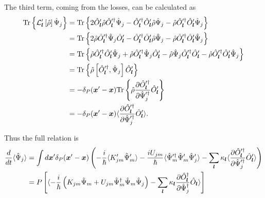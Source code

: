 The third term, coming from the losses, can be calculated as
\begin{equation*}
\begin{split}
	\mathrm{Tr} \left\{ 
		\mathcal{L}_{\boldsymbol{l}}^\prime \left[ \hat{\rho} \right]
		\hat{\Psi}_j
	 \right\}
	& = \mathrm{Tr} \left\{ 
		2 \hat{O}_{\boldsymbol{l}}^\prime \hat{\rho} \hat{O}_{\boldsymbol{l}}^{\prime\dagger} \hat{\Psi}_j
		- \hat{O}_{\boldsymbol{l}}^{\prime\dagger} \hat{O}_{\boldsymbol{l}}^\prime \hat{\rho} \hat{\Psi}_j
		- \hat{\rho} \hat{O}_{\boldsymbol{l}}^{\prime\dagger} \hat{O}_{\boldsymbol{l}}^\prime \hat{\Psi}_j
	 \right\} \\
	& = \mathrm{Tr} \left\{ 
		2 \hat{\rho} \hat{O}_{\boldsymbol{l}}^{\prime\dagger} \hat{\Psi}_j \hat{O}_{\boldsymbol{l}}^\prime
		- \hat{O}_{\boldsymbol{l}}^{\prime\dagger} \hat{O}_{\boldsymbol{l}}^\prime \hat{\rho} \hat{\Psi}_j
		- \hat{\rho} \hat{O}_{\boldsymbol{l}}^{\prime\dagger} \hat{O}_{\boldsymbol{l}}^\prime \hat{\Psi}_j
	 \right\} \\
	& = \mathrm{Tr} \left\{ 
		\hat{\rho} \hat{O}_{\boldsymbol{l}}^{\prime\dagger} \hat{O}_{\boldsymbol{l}}^\prime \hat{\Psi}_j
		+ \hat{\rho} \hat{O}_{\boldsymbol{l}}^{\prime\dagger} \hat{\Psi}_j \hat{O}_{\boldsymbol{l}}^\prime
		- \hat{\rho} \hat{\Psi}_j \hat{O}_{\boldsymbol{l}}^{\prime\dagger} \hat{O}_{\boldsymbol{l}}^\prime
		- \hat{\rho} \hat{O}_{\boldsymbol{l}}^{\prime\dagger} \hat{O}_{\boldsymbol{l}}^\prime \hat{\Psi}_j
	 \right\} \\
	& = \mathrm{Tr} \left\{ 
		\hat{\rho} \left[
			\hat{O}_{\boldsymbol{l}}^{\prime\dagger}, \hat{\Psi}_j
		\right] \hat{O}_{\boldsymbol{l}}^\prime
	 \right\} \\
	& = -\delta_P(\boldsymbol{x}^\prime - \boldsymbol{x})	\mathrm{Tr} \left\{ 
		\hat{\rho} \frac{\partial \hat{O}_{\boldsymbol{l}}^{\prime\dagger}}{\partial \hat{\Psi}_j^{\prime\dagger}}
		\hat{O}_{\boldsymbol{l}}^\prime
	 \right\} \\
	& = -\delta_P(\boldsymbol{x}^\prime - \boldsymbol{x}) \langle
		\frac{\partial \hat{O}_{\boldsymbol{l}}^{\prime\dagger}}{\partial \hat{\Psi}_j^{\prime\dagger}}
		\hat{O}_{\boldsymbol{l}}^\prime
	\rangle.
\end{split}
\end{equation*}

Thus the full relation is
\begin{equation*}
\begin{split}
	\frac{d}{dt} \langle \hat{\Psi}_j \rangle
	& = \int d\boldsymbol{x}^\prime \delta_P(\boldsymbol{x}^\prime - \boldsymbol{x}) \left(
		- \frac{i}{\hbar} \langle K_{jm}^\prime \hat{\Psi}_m^\prime \rangle
		- \frac{i U_{jm}}{\hbar} \langle
			\hat{\Psi}_m^{\prime\dagger} \hat{\Psi}_m^\prime \hat{\Psi}_j^\prime
		\rangle
		- \sum_{\boldsymbol{l}} \kappa_{\boldsymbol{l}} \langle
			\frac{\partial \hat{O}_{\boldsymbol{l}}^{\prime\dagger}}{\partial \hat{\Psi}_j^{\prime\dagger}}
			\hat{O}_{\boldsymbol{l}}^\prime
		\rangle
	\right) \\
	& = P \left[
		\langle
			-\frac{i}{\hbar} \left(
				K_{jm} \hat{\Psi}_m
				+ U_{jm} \hat{\Psi}_m^\dagger \hat{\Psi}_m \hat{\Psi}_j
			\right)
			- \sum_{\boldsymbol{l}} \kappa_{\boldsymbol{l}}
				\frac{\partial \hat{O}_{\boldsymbol{l}}^\dagger}{\partial \hat{\Psi}_j^\dagger} \hat{O}_{\boldsymbol{l}}
		\rangle
	\right]
\end{split}
\end{equation*}
